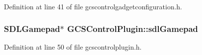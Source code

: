\-Definition at line 41 of file gcscontrolgadgetconfiguration.\-h.

\hypertarget{group___g_c_s_control_gadget_plugin_ga3cd3b8ed3b17b5405fb2f71803a65951}{
\subsubsection[{sdl\-Gamepad}]{\setlength{\rightskip}{0pt plus 5cm}\-S\-D\-L\-Gamepad$\ast$ {\bf \-G\-C\-S\-Control\-Plugin\-::sdl\-Gamepad}}}\label{group___g_c_s_control_gadget_plugin_ga3cd3b8ed3b17b5405fb2f71803a65951}


\-Definition at line 50 of file gcscontrolplugin.\-h.



